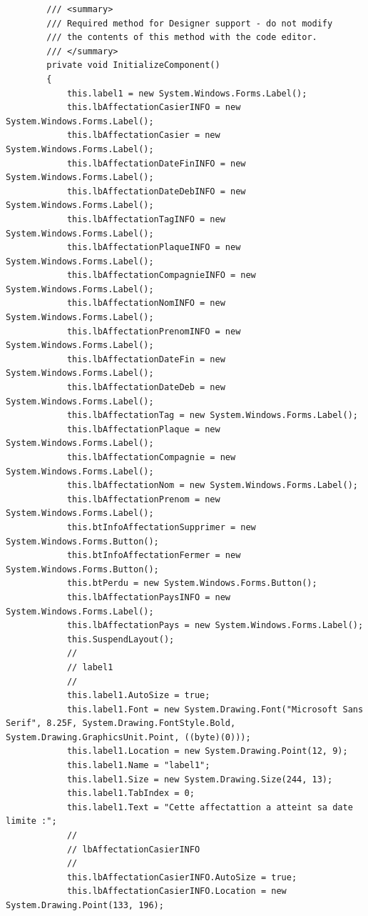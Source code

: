 \documentclass[main.tex]{subfiles}
\begin{document}
\begin{lstlisting}
        /// <summary>
        /// Required method for Designer support - do not modify
        /// the contents of this method with the code editor.
        /// </summary>
        private void InitializeComponent()
        {
            this.label1 = new System.Windows.Forms.Label();
            this.lbAffectationCasierINFO = new System.Windows.Forms.Label();
            this.lbAffectationCasier = new System.Windows.Forms.Label();
            this.lbAffectationDateFinINFO = new System.Windows.Forms.Label();
            this.lbAffectationDateDebINFO = new System.Windows.Forms.Label();
            this.lbAffectationTagINFO = new System.Windows.Forms.Label();
            this.lbAffectationPlaqueINFO = new System.Windows.Forms.Label();
            this.lbAffectationCompagnieINFO = new System.Windows.Forms.Label();
            this.lbAffectationNomINFO = new System.Windows.Forms.Label();
            this.lbAffectationPrenomINFO = new System.Windows.Forms.Label();
            this.lbAffectationDateFin = new System.Windows.Forms.Label();
            this.lbAffectationDateDeb = new System.Windows.Forms.Label();
            this.lbAffectationTag = new System.Windows.Forms.Label();
            this.lbAffectationPlaque = new System.Windows.Forms.Label();
            this.lbAffectationCompagnie = new System.Windows.Forms.Label();
            this.lbAffectationNom = new System.Windows.Forms.Label();
            this.lbAffectationPrenom = new System.Windows.Forms.Label();
            this.btInfoAffectationSupprimer = new System.Windows.Forms.Button();
            this.btInfoAffectationFermer = new System.Windows.Forms.Button();
            this.btPerdu = new System.Windows.Forms.Button();
            this.lbAffectationPaysINFO = new System.Windows.Forms.Label();
            this.lbAffectationPays = new System.Windows.Forms.Label();
            this.SuspendLayout();
            // 
            // label1
            // 
            this.label1.AutoSize = true;
            this.label1.Font = new System.Drawing.Font("Microsoft Sans Serif", 8.25F, System.Drawing.FontStyle.Bold, System.Drawing.GraphicsUnit.Point, ((byte)(0)));
            this.label1.Location = new System.Drawing.Point(12, 9);
            this.label1.Name = "label1";
            this.label1.Size = new System.Drawing.Size(244, 13);
            this.label1.TabIndex = 0;
            this.label1.Text = "Cette affectattion a atteint sa date limite :";
            // 
            // lbAffectationCasierINFO
            // 
            this.lbAffectationCasierINFO.AutoSize = true;
            this.lbAffectationCasierINFO.Location = new System.Drawing.Point(133, 196);

\end{lstlisting}
\end{document}
